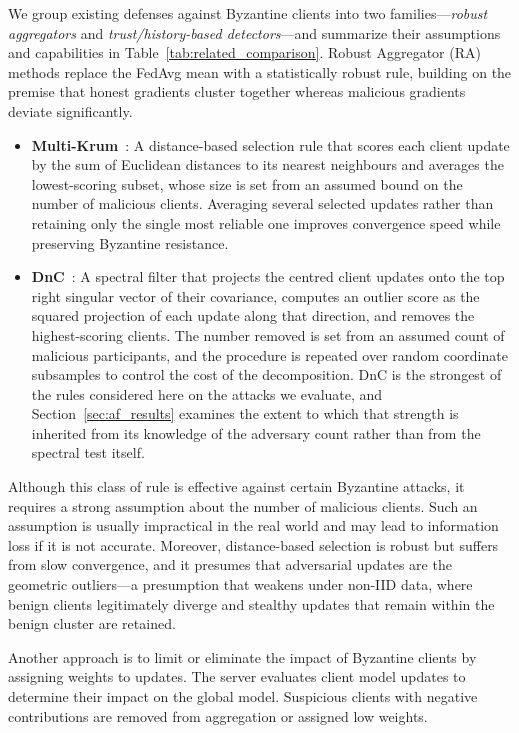 \documentclass[journal]{IEEEtran}
\begin{document}
We group existing defenses against Byzantine clients into two families---\emph{robust aggregators} and \emph{trust/history-based detectors}---and summarize their assumptions and capabilities in Table~\ref{tab:related_comparison}. Robust Aggregator (RA) methods replace the FedAvg mean with a statistically robust rule, building on the premise that honest gradients cluster together whereas malicious gradients deviate significantly.

\begin{itemize}
    \item \textbf{Multi-Krum}~\cite{blanchard2017machine}: A distance-based selection rule that scores each client update by the sum of Euclidean distances to its nearest neighbours and averages the lowest-scoring subset, whose size is set from an assumed bound on the number of malicious clients. Averaging several selected updates rather than retaining only the single most reliable one improves convergence speed while preserving Byzantine resistance.

    \item \textbf{DnC}~\cite{shejwalkar2021manipulating}: A spectral filter that projects the centred client updates onto the top right singular vector of their covariance, computes an outlier score as the squared projection of each update along that direction, and removes the highest-scoring clients. The number removed is set from an assumed count of malicious participants, and the procedure is repeated over random coordinate subsamples to control the cost of the decomposition. DnC is the strongest of the rules considered here on the attacks we evaluate, and Section~\ref{sec:af_results} examines the extent to which that strength is inherited from its knowledge of the adversary count rather than from the spectral test itself.
\end{itemize}

Although this class of rule is effective against certain Byzantine attacks, it requires a strong assumption about the number of malicious clients. Such an assumption is usually impractical in the real world and may lead to information loss if it is not accurate. Moreover, distance-based selection is robust but suffers from slow convergence, and it presumes that adversarial updates are the geometric outliers---a presumption that weakens under non-IID data, where benign clients legitimately diverge and stealthy updates that remain within the benign cluster are retained.

Another approach is to limit or eliminate the impact of Byzantine clients by assigning weights to updates. The server evaluates client model updates to determine their impact on the global model. Suspicious clients with negative contributions are removed from aggregation or assigned low weights.
\end{document}
